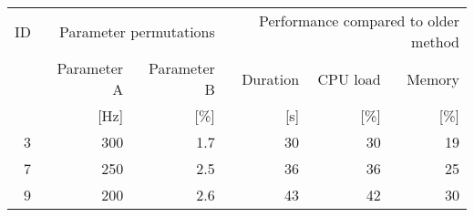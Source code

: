 \begin{table}[!ht]
    \centering
    \footnotesize
    \begin{tabular}{r r r r r r} 
        \toprule
        \multicolumn{1}{V{2em}}{ID} & \multicolumn{2}{N}{Parameter permutations} & \multicolumn{3}{V{15em}}{Performance compared to older method} \\

        \cmidrule(lr){2-3}\cmidrule(lr){4-6} 
        
        & \multicolumn{1}{V{5em}}{Parameter A} & \multicolumn{1}{V{5em}}{Parameter B}  & \multicolumn{1}{N}{Duration} & \multicolumn{1}{N}{CPU load} & \multicolumn{1}{V{3.5em}}{Memory} \\
        & \multicolumn{1}{N}{[Hz]}             & \multicolumn{1}{N}{[\%]}              & \multicolumn{1}{N}{[s]}      & \multicolumn{1}{N}{[\%]}     & \multicolumn{1}{N}{[\%]}  \\
        
        \cmidrule(lr){1-1}\cmidrule(lr){2-2}\cmidrule(lr){3-3}\cmidrule(lr){4-4}%
        \cmidrule(lr){5-5}\cmidrule(lr){6-6}
        3    & 300       & 1.7     & 30  & 30  & 19   \\
        7    & 250       & 2.5     & 36  & 36  & 25   \\
        9    & 200       & 2.6     & 43  & 42  & 30   \\
        \bottomrule
    \end{tabular}
\end{table}


